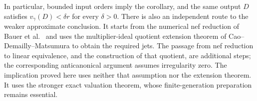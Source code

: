 In particular, bounded input orders imply the corollary, and the same
output \(D\) satisfies \(v_\gamma(D)<\delta r\) for every \(\delta>0\).
There is also an independent route to the weaker approximate conclusion.
It starts from the numerical nef reduction of Bauer et al.\ 
\cite[Theorem~2.1]{BCEKPRSW2002} and uses the multiplier-ideal quotient
extension theorem of Cao--Demailly--Matsumura
\cite[Theorem~1.1]{CDM2017} to obtain the required jets. The passage
from nef reduction to linear equivalence, and the construction of that
quotient, are additional steps; the corresponding anticanonical
argument assumes irregularity zero. The implication proved here uses
neither that assumption nor the extension theorem. It uses the stronger
exact valuation theorem, whose finite-generation preparation remains essential.

